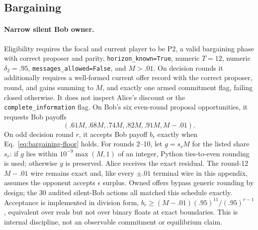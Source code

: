 \subsection{Bargaining}
\label{app:policy-bargaining}

\paragraph{Narrow silent Bob owner.}
Eligibility requires the focal and current player to be P2, a valid bargaining
phase with correct proposer and parity, \texttt{horizon\_known=True}, numeric
$T=12$, numeric $\delta_2=.95$, \texttt{messages\_allowed=False}, and $M>.01$.
On decision rounds it additionally requires a well-formed current offer record
with the correct proposer, round, and gains summing to $M$, and exactly one
armed commitment flag, failing closed otherwise.
It does not inspect Alice's discount or the \texttt{complete\_information}
flag. On Bob's six even-round proposal opportunities, it requests Bob payoffs
\[
(.61M,.68M,.74M,.82M,.91M,M-.01).
\]
On odd decision round $r$, it accepts Bob payoff $b_r$ exactly when
Eq.~\eqref{eq:bargaining-floor} holds. For rounds 2--10, let $g=s_rM$ for the
listed share $s_r$: if $g$ lies within $10^{-9}\max(M,1)$ of an integer, Python
ties-to-even rounding is used; otherwise $g$ is preserved. Alice receives the
exact residual. The round-12 $M-.01$ wire remains exact and, like every $\pm.01$ terminal
wire in this appendix, assumes the opponent accepts $\epsilon$ surplus.
Owned offers bypass generic rounding by design; the 30 audited silent-Bob
actions all matched this schedule exactly. Acceptance is implemented in
division form, $b_r\geq(M-.01)(.95)^{11}/(.95)^{r-1}$, equivalent over reals
but not over binary floats at exact boundaries. This is internal discipline,
not an observable commitment or equilibrium claim.


